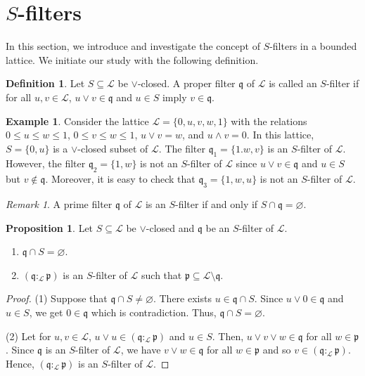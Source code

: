 \documentclass[preprint,review,10pt]{amsart}
\theoremstyle{definition}
\newtheorem{definition}[theorem]{Definition}
\newtheorem{example}[theorem]{Example}
\newtheorem{proposition}[theorem]{Proposition}
\theoremstyle{remark}
\newtheorem{remark}[theorem]{Remark}
\numberwithin{equation}{section}
\begin{document}
\section{$S$-filters}
In this section, we introduce and investigate the  concept of $S$-filters in a bounded lattice. We initiate our study with the following definition.
\begin{definition}
Let $S \subseteq \mathscr{L}$ be   $\vee$-closed. A proper filter $\mathfrak {q}$ of $\mathscr{L}$ is called an $S$-filter if for all $u,v \in \mathscr{L}$, $u \vee v \in \mathfrak{q}$ and $u \in S$ imply $v \in \mathfrak{q}$.
\end{definition}
\begin{example}
Consider the lattice $\mathscr{L} = \{0, u, v, w, 1\}$   with the relations $0 \le u \le w \le 1$, $0 \le v \le w \le 1$, $u \vee v = w$, and $u \wedge v = 0$. In this lattice,  $S=\{0,u\}$ is a $\vee$-closed subset of $\mathscr{L}$. The filter $\mathfrak{q}_1=\{1.w,v\}$ is an $S$-filter of $\mathscr{L}$. However, the filter $\mathfrak{q}_2= \{1, w\}$  is  not an $S$-filter  of $\mathscr{L}$ since $u \vee v \in  \mathfrak{q}$ and $u \in S$ but $v \notin \mathfrak{q}$. Moreover, it is easy to check that  $\mathfrak{q}_3= \{1, w,u\}$ is  not an $S$-filter of $\mathscr{L}$.
\end{example}
\begin{remark} \label{0}
A prime filter $\mathfrak {q}$ of $\mathscr{L}$ is an $S$-filter if and only if $S \cap  \mathfrak {q}=\varnothing$.
\end{remark}
\begin{proposition} \label{1}
Let $S \subseteq \mathscr{L}$ be   $\vee$-closed and $\mathfrak {q}$ be an $S$-filter of $\mathscr{L}$. 
\begin{enumerate}
\item $\mathfrak {q} \cap S=\varnothing$.
\item $(\mathfrak {q} :_{\mathscr{L}}\mathfrak {p})$ is an $S$-filter of $\mathscr{L}$ such that $\mathfrak {p} \subseteq \mathscr{L} \setminus \mathfrak {q}$.
\end{enumerate}
\end{proposition}
\begin{proof}
(1) Suppose that $\mathfrak {q} \cap S \neq \varnothing$. There exists $u \in \mathfrak {q} \cap S$. Since $u \vee 0 \in \mathfrak {q}$ and $u \in S$, we get $0 \in \mathfrak {q}$ which is contradiction. Thus, $\mathfrak {q} \cap S=\varnothing$.

(2) Let for $u, v \in \mathscr{L}$, $u \vee u \in (\mathfrak {q} :_{\mathscr{L}}\mathfrak {p})$  and $u \in S$. Then, $u \vee v \vee w \in \mathfrak {q}$ for all $w \in \mathfrak {p}$. Since $\mathfrak {q}$ is an $S$-filter of $\mathscr{L}$, we have $v \vee w \in \mathfrak {q}$ for all $w \in \mathfrak {p}$ and so $v \in (\mathfrak {q} :_{\mathscr{L}}\mathfrak {p})$. Hence, $(\mathfrak {q} :_{\mathscr{L}}\mathfrak {p})$ is an $S$-filter of $\mathscr{L}$.
\end{proof}
\end{document}
